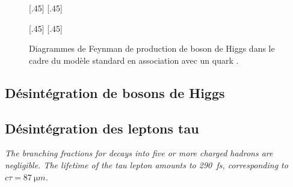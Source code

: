\begin{figure}[h]
\centering
\vspace{\baselineskip}
\subcaptionbox{\label{subfig-fgraph-Higgs_with_b_gg_g_bbh}}[.45\textwidth]
{\vspace{\baselineskip}}
\qquad
\subcaptionbox{\label{subfig-fgraph-Higgs_with_b_qq_g_bbh}}[.45\textwidth]
{\vspace{\baselineskip}}

\vspace{2\baselineskip}
\subcaptionbox{\label{subfig-fgraph-Higgs_with_b_gg_hbb}}[.45\textwidth]
{\vspace{\baselineskip}}
\qquad
\subcaptionbox{\label{subfig-fgraph-Higgs_with_b_bg_b_bh}}[.45\textwidth]
{\vspace{\baselineskip}}

\caption{Diagrammes de Feynman de production de boson de Higgs dans le cadre du modèle standard en association avec un quark \quarkb.}
\label{fig-fgraph-Higgs_prod_with_b}
\end{figure}










\subsection{Désintégration de bosons de Higgs}\label{chapter-MS-MSSM-section-pheno_Higgs_MSSM-subsec-desintegration_Higgs}



\subsection{Désintégration des leptons tau}\label{chapter-MS-MSSM-section-pheno_Higgs_MSSM-subsec-desintegration_lepton_tau}
\emph{The branching fractions for decays into five or more charged hadrons are negligible. The lifetime of the tau lepton amounts to \SI{290}{fs}, corresponding to $c\tau = \SI{87}{\micro m}$.}

